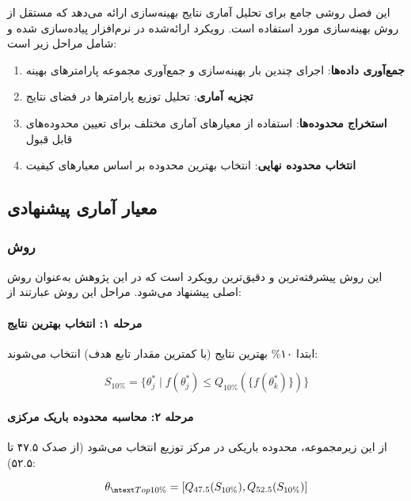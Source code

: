 این فصل روشی جامع برای تحلیل آماری نتایج بهینه‌سازی ارائه می‌دهد که مستقل از روش بهینه‌سازی مورد استفاده است. رویکرد ارائه‌شده در نرم‌افزار  پیاده‌سازی شده و شامل مراحل زیر است:

\begin{enumerate}
    \item \textbf{جمع‌آوری داده‌ها}: اجرای چندین بار بهینه‌سازی و جمع‌آوری مجموعه پارامترهای بهینه
    \item \textbf{تجزیه آماری}: تحلیل توزیع پارامترها در فضای نتایج
    \item \textbf{استخراج محدوده‌ها}: استفاده از معیارهای آماری مختلف برای تعیین محدوده‌های قابل قبول
    \item \textbf{انتخاب محدوده نهایی}: انتخاب بهترین محدوده بر اساس معیارهای کیفیت
\end{enumerate}

\subsection{معیار آماری پیشنهادی}

\subsubsection{روش }

این روش پیشرفته‌ترین و دقیق‌ترین رویکرد است که در این پژوهش به‌عنوان روش اصلی پیشنهاد می‌شود. مراحل این روش عبارتند از:

\paragraph{مرحله ۱: انتخاب بهترین نتایج}
ابتدا ۱۰\% بهترین نتایج (با کمترین مقدار تابع هدف) انتخاب می‌شوند:

\begin{equation}
S_{10\%} = \{\theta^*_j \mid f(\theta^*_j) \leq Q_{10\%}(\{f(\theta^*_k)\})\}
\end{equation}

\paragraph{مرحله ۲: محاسبه محدوده باریک مرکزی}
از این زیرمجموعه، محدوده باریکی در مرکز توزیع انتخاب می‌شود (از صدک ۴۷.۵ تا ۵۲.۵):

\begin{equation}
\theta_{\mtext{Top10\%}} = [Q_{47.5}(S_{10\%}), Q_{52.5}(S_{10\%})]
\end{equation}

